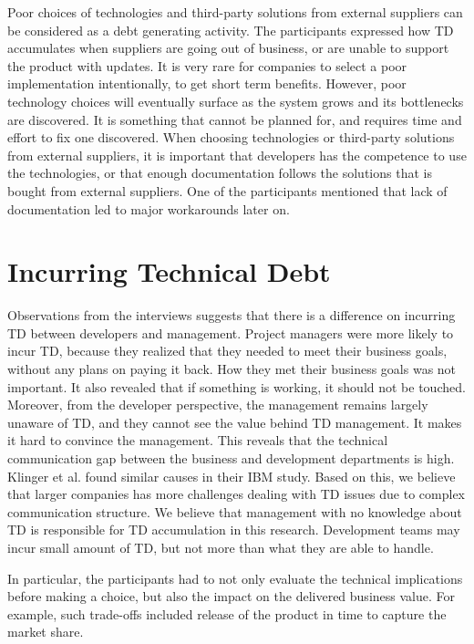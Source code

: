 Poor choices of technologies and third-party solutions from external suppliers can be considered as a debt generating activity. The participants expressed how TD accumulates when suppliers are going out of business, or are unable to support the product with updates. It is very rare for companies to select a poor implementation intentionally, to get short term benefits. However, poor technology choices will eventually surface as the system grows and its bottlenecks are discovered. It is something that cannot be planned for, and requires time and effort to fix one discovered. When choosing technologies or third-party solutions from external suppliers, it is important that developers has the competence to use the technologies, or that enough documentation follows the solutions that is bought from external suppliers. One of the participants mentioned that lack of documentation led to major workarounds later on.

\section{Incurring Technical Debt}
Observations from the interviews suggests that there is a difference on incurring TD between developers and management. Project managers were more likely to incur TD, because they realized that they needed to meet their business goals, without any plans on paying it back. How they met their business goals was not important. It also revealed that if something is working, it should not be touched. Moreover, from the developer perspective, the management remains largely unaware of TD, and they cannot see the value behind TD management. It makes it hard to convince the management. This reveals that the technical communication gap between the business and development departments is high. Klinger et al.\cite{p35-klinger} found similar causes in their IBM study. Based on this, we believe that larger companies has more challenges dealing with TD issues due to complex communication structure. We believe that management with no knowledge about TD is responsible for TD accumulation in this research.  Development teams may incur small amount of TD, but not more than what they are able to handle.

In particular, the participants had to not only evaluate the technical implications before making a choice, but also the impact on the delivered business value. For example, such trade-offs included release of the product in time to capture the market share. 

